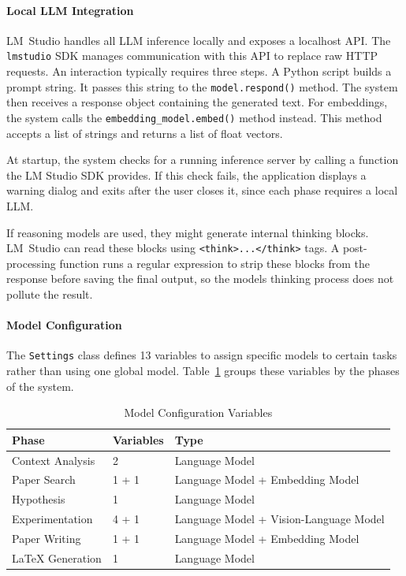 \paragraph{Local LLM Integration}
LM~Studio handles all LLM inference locally and exposes a localhost API.
The \texttt{lmstudio} SDK manages communication with this API to replace raw HTTP requests.
An interaction typically requires three steps.
A Python script builds a prompt string.
It passes this string to the \texttt{model.respond()} method.
The system then receives a response object containing the generated text.
For embeddings, the system calls the \texttt{embedding\_model.embed()} method instead.
This method accepts a list of strings and returns a list of float vectors.

At startup, the system checks for a running inference server by calling a function the LM Studio SDK provides.
If this check fails, the application displays a warning dialog and exits after the user closes it, since each phase requires a local LLM.

If reasoning models are used, they might generate internal thinking blocks.
LM~Studio can read these blocks using \texttt{<think>...</think>} tags.
A post-processing function runs a regular expression to strip these blocks from the response before saving the final output, so the models thinking process does not pollute the result.

\paragraph{Model Configuration}
The \texttt{Settings} class defines 13 variables to assign specific models to certain tasks rather than using one global model.
Table~\ref{tab:model_variables} groups these variables by the phases of the system.

\begin{table}[htbp]
    \centering
    \caption{Model Configuration Variables}
    \label{tab:model_variables}
    \begin{tabularx}{\textwidth}{l l X}
        \toprule
        \textbf{Phase} & \textbf{Variables} & \textbf{Type} \\
        \midrule
        Context Analysis & 2 & Language Model \\
        Paper Search & 1 + 1 & Language Model + Embedding Model \\
        Hypothesis & 1 & Language Model \\
        Experimentation & 4 + 1 & Language Model + Vision-Language Model \\
        Paper Writing & 1 + 1 & Language Model + Embedding Model \\
        \LaTeX{} Generation & 1 & Language Model \\
        \bottomrule
    \end{tabularx}
\end{table}


